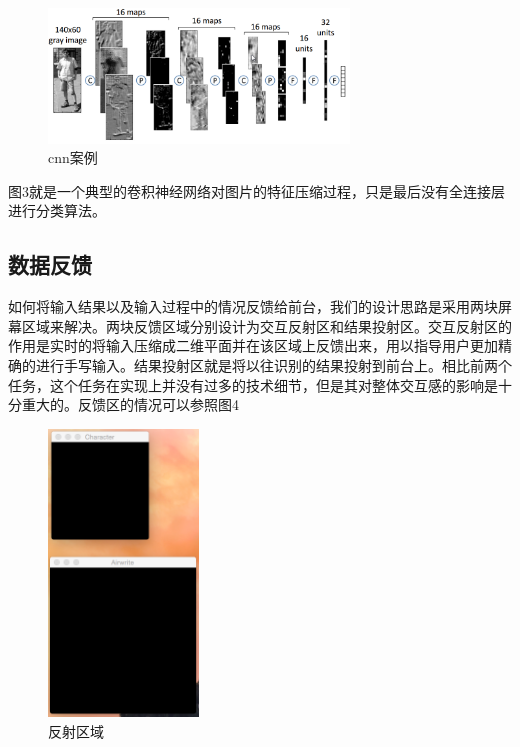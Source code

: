 \documentclass[10pt, twocolumn]{article}
\begin{document}
	\begin{figure}[htb]
	\centering
	\begin{minipage}[t]{1\linewidth}
	\centering
	\includegraphics[width=8cm]{cnn2.png}
	\caption{cnn案例}
	\label{fig: case_cnn}
	\end{minipage}
	\end{figure}

	图3就是一个典型的卷积神经网络对图片的特征压缩过程，只是最后没有全连接层进行分类算法。

	\subsection{数据反馈}

	如何将输入结果以及输入过程中的情况反馈给前台，我们的设计思路是采用两块屏幕区域来解决。两块反馈区域分别设计为交互反射区和结果投射区。交互反射区的作用是实时的将输入压缩成二维平面并在该区域上反馈出来，用以指导用户更加精确的进行手写输入。结果投射区就是将以往识别的结果投射到前台上。相比前两个任务，这个任务在实现上并没有过多的技术细节，但是其对整体交互感的影响是十分重大的。反馈区的情况可以参照图4

	\begin{figure}[htb]
	\centering
	\begin{minipage}[t]{1\linewidth}
	\centering
	\includegraphics[width=4cm]{a}
	\caption{反射区域}
	\label{fig: reflect_area}
	\end{minipage}
	\end{figure}
\end{document}
